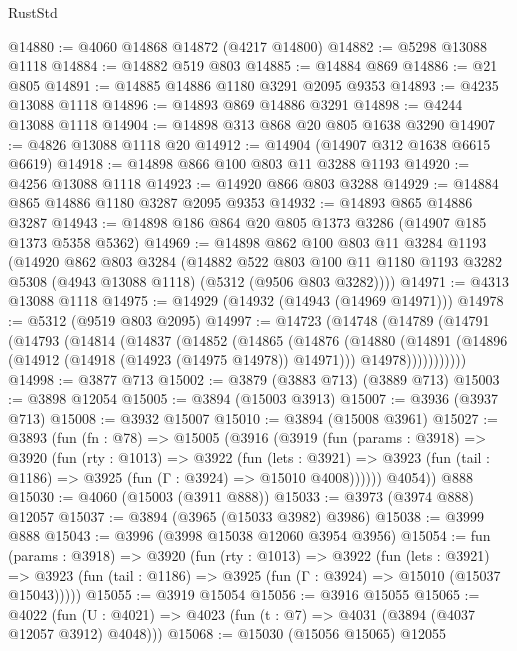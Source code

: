 \begin{lexlean}{RustStd}
\begin{coremodule}
@14880 := @4060 @14868 @14872 (@4217 @14800)
@14882 := @5298 @13088 @1118
@14884 := @14882 @519 @803
@14885 := @14884 @869
@14886 := @21 @805
@14891 := @14885 @14886 @1180 @3291 @2095 @9353
@14893 := @4235 @13088 @1118
@14896 := @14893 @869 @14886 @3291
@14898 := @4244 @13088 @1118
@14904 := @14898 @313 @868 @20 @805 @1638 @3290
@14907 := @4826 @13088 @1118 @20
@14912 := @14904 (@14907 @312 @1638 @6615 @6619)
@14918 := @14898 @866 @100 @803 @11 @3288 @1193
@14920 := @4256 @13088 @1118
@14923 := @14920 @866 @803 @3288
@14929 := @14884 @865 @14886 @1180 @3287 @2095 @9353
@14932 := @14893 @865 @14886 @3287
@14943 := @14898 @186 @864 @20 @805 @1373 @3286 (@14907 @185 @1373 @5358 @5362)
@14969 := @14898
    @862
    @100
    @803
    @11
    @3284
    @1193
    (@14920
      @862
      @803
      @3284
      (@14882
        @522
        @803
        @100
        @11
        @1180
        @1193
        @3282
        @5308
        (@4943 @13088 @1118)
        (@5312 (@9506 @803 @3282))))
@14971 := @4313 @13088 @1118
@14975 := @14929 (@14932 (@14943 (@14969 @14971)))
@14978 := @5312 (@9519 @803 @2095)
@14997 := @14723
    (@14748
      (@14789
        (@14791
          (@14793
            (@14814
              (@14837
                (@14852
                  (@14865
                    (@14876
                      (@14880
                        (@14891
                          (@14896 (@14912 (@14918 (@14923 (@14975 @14978)) @14971)))
                          @14978)))))))))))
@14998 := @3877 @713
@15002 := @3879 (@3883 @713) (@3889 @713)
@15003 := @3898 @12054
@15005 := @3894 (@15003 @3913)
@15007 := @3936 (@3937 @713)
@15008 := @3932 @15007
@15010 := @3894 (@15008 @3961)
@15027 := @3893
    (fun (fn : @78) =>
    @15005
      (@3916
        (@3919
          (fun (params : @3918) =>
          @3920
            (fun (rty : @1013) =>
            @3922
              (fun (lets : @3921) =>
              @3923 (fun (tail : @1186) => @3925 (fun (Γ : @3924) => @15010 @4008))))))
        @4054))
    @888
@15030 := @4060 (@15003 (@3911 @888))
@15033 := @3973 (@3974 @888) @12057
@15037 := @3894 (@3965 (@15033 @3982) @3986)
@15038 := @3999 @888
@15043 := @3996 (@3998 @15038 @12060 @3954 @3956)
@15054 := fun (params : @3918) =>
  @3920
    (fun (rty : @1013) =>
    @3922
      (fun (lets : @3921) =>
      @3923 (fun (tail : @1186) => @3925 (fun (Γ : @3924) => @15010 (@15037 @15043)))))
@15055 := @3919 @15054
@15056 := @3916 @15055
@15065 := @4022
    (fun (U : @4021) => @4023 (fun (t : @7) => @4031 (@3894 (@4037 @12057 @3912) @4048)))
@15068 := @15030 (@15056 @15065) @12055

\end{coremodule}
\end{lexlean}
